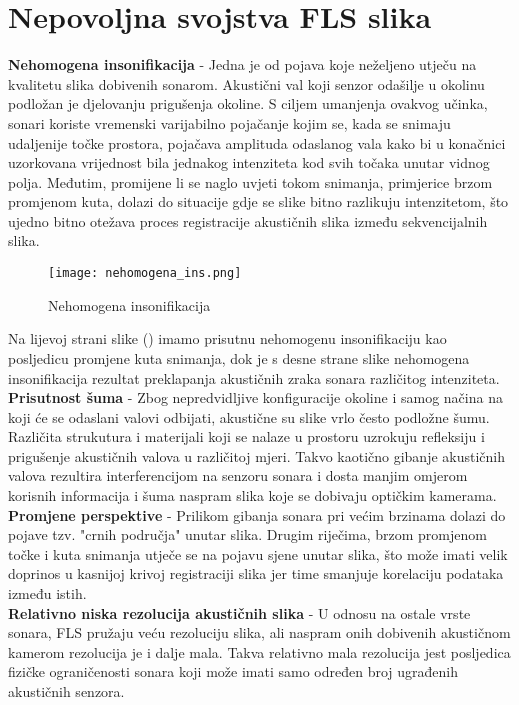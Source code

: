 \documentclass[times, utf8, diplomski]{fer}
\begin{document}
\section{Nepovoljna svojstva FLS slika}
\textbf{Nehomogena insonifikacija} - Jedna je od pojava koje neželjeno utječu na kvalitetu slika dobivenih sonarom. Akustični val koji senzor odašilje u okolinu  podložan je djelovanju prigušenja okoline. S ciljem umanjenja ovakvog učinka, sonari koriste vremenski varijabilno pojačanje kojim se, kada se snimaju udaljenije točke prostora, pojačava amplituda odaslanog vala kako bi u konačnici uzorkovana vrijednost bila jednakog intenziteta kod svih točaka unutar vidnog polja. Međutim, promijene li se naglo uvjeti tokom snimanja, primjerice brzom promjenom kuta, dolazi do situacije gdje se slike bitno razlikuju intenzitetom, što ujedno bitno otežava proces registracije akustičnih slika između sekvencijalnih slika.
\\
\begin{figure}[htb]
\centering
\texttt{[image: nehomogena\_ins.png]}
\caption{Nehomogena insonifikacija}
\label{fig:Nehomogena insonifikacija}
\end{figure}
Na lijevoj strani slike () imamo prisutnu nehomogenu insonifikaciju kao posljedicu promjene kuta snimanja, dok je s desne strane slike nehomogena insonifikacija rezultat preklapanja akustičnih zraka sonara različitog intenziteta.
\\
\textbf{Prisutnost šuma} - Zbog nepredvidljive konfiguracije okoline i samog načina na koji će se odaslani valovi odbijati, akustične su slike vrlo često podložne šumu. Različita strukutura i materijali koji se nalaze u prostoru uzrokuju refleksiju i prigušenje akustičnih valova u različitoj mjeri. Takvo kaotično gibanje akustičnih valova rezultira interferencijom na senzoru sonara i dosta manjim omjerom korisnih informacija i šuma naspram slika koje se dobivaju optičkim kamerama.
\\
\textbf{Promjene perspektive} - Prilikom gibanja sonara pri većim brzinama dolazi do pojave tzv. "crnih područja" unutar slika. Drugim riječima, brzom promjenom točke i kuta snimanja utječe se na pojavu sjene unutar slika, što može imati velik doprinos u kasnijoj krivoj registraciji slika jer time smanjuje korelaciju podataka između istih.
\\
\textbf{Relativno niska rezolucija akustičnih slika} - U odnosu na ostale vrste sonara, FLS pružaju veću rezoluciju slika, ali naspram onih dobivenih akustičnom kamerom rezolucija je i dalje mala. Takva relativno mala rezolucija jest posljedica fizičke ograničenosti sonara koji može imati samo određen broj ugrađenih akustičnih senzora.
\end{document}
